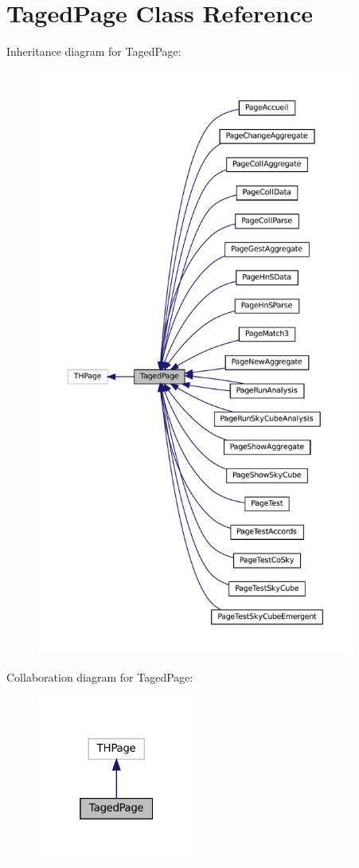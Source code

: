 \hypertarget{class_taged_page}{}\section{Taged\+Page Class Reference}
\label{class_taged_page}


Inheritance diagram for Taged\+Page\+:\nopagebreak
\begin{figure}[H]
\begin{center}
\leavevmode
\includegraphics[height=550pt]{class_taged_page__inherit__graph}
\end{center}
\end{figure}


Collaboration diagram for Taged\+Page\+:\nopagebreak
\begin{figure}[H]
\begin{center}
\leavevmode
\includegraphics[width=148pt]{class_taged_page__coll__graph}
\end{center}
\end{figure}
